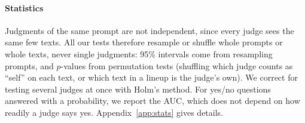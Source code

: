\paragraph{Statistics} Judgments of the same prompt are not independent,
since every judge sees the same few texts. All our tests therefore resample
or shuffle whole prompts or whole texts, never single judgments: 95\%
intervals come from resampling prompts, and $p$-values from permutation
tests (shuffling which judge counts as ``self'' on each text, or which text
in a lineup is the judge's own). We correct for testing several judges at
once with Holm's method. For yes/no questions answered with a probability,
we report the AUC, which does not depend on how readily a judge says yes.
Appendix~\ref{app:stats} gives details.
